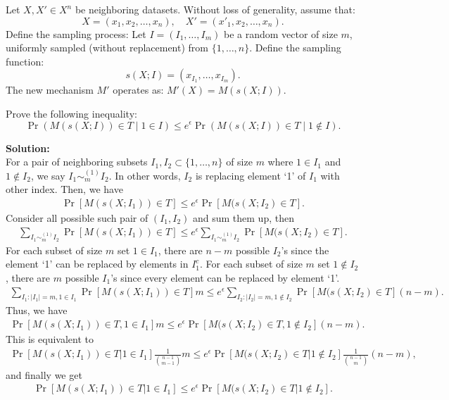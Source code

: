 \documentclass[12pt]{article}
\begin{document}
\begin{enumerate}
Let $X, X' \in X^n$ be neighboring datasets. Without loss of generality, assume that:
\[
X = (x_1, x_2, \dots, x_n), \quad X' = (x'_1, x_2, \dots, x_n).
\]
Define the sampling process:
Let $I = (I_1, \dots, I_m)$ be a random vector of size $m$, uniformly sampled (without replacement) from $\{1, \dots, n\}$.
Define the sampling function:
\[
s(X; I) = (x_{I_1}, \dots, x_{I_m}).
\]
The new mechanism $M'$ operates as: $M'(X) = M(s(X; I))$.

Prove the following inequality:
\[
\Pr(M (s(X; I)) \in T \mid 1 \in I) \leq e^{\epsilon} \Pr(M (s(X; I)) \in T \mid 1 \notin I).
\]
\begin{solution}
{\bf Solution:}\\
For a pair of neighboring subsets $I_1, I_2\subset \{1, \dots, n\}$ of size $m$ 
where $1\in I_1$ and $1\notin I_2$, we say $I_1 \sim_m^{(1)} I_2$.
In other words, $I_2$ is replacing element `1' of $I_1$ with other index.
Then, we have
\begin{align}
    \Pr[M(s(X;I_1))\in T] \leq e^\epsilon \Pr[M(s(X;I_2)\in T].
\end{align}
Consider all possible such pair of $(I_1, I_2)$ and sum them up, then
\begin{align}
    \sum_{I_1\sim_m^{(1)} I_2} \Pr[M(s(X;I_1))\in T] \leq e^\epsilon \sum_{I_1\sim_m^{(1)} I_2} \Pr[M(s(X;I_2)\in T].
\end{align}
For each subset of size $m$ set $1\in I_1$, there are $n-m$ possible $I_2$'s
since the element `1' can be replaced by elements in $I_1^c$.
For each subset of size $m$ set $1\notin I_2$, there are $m$ possible $I_1$'s
since every element can be replaced by element `1'.
\begin{align}
    \sum_{I_1: |I_1|=m, 1\in I_1} \Pr[M(s(X;I_1))\in T] m 
    \leq e^\epsilon \sum_{I_2: |I_2|=m, 1\notin I_2} \Pr[M(s(X;I_2)\in T] (n-m).
\end{align}
Thus, we have
\begin{align}
    \Pr[M(s(X;I_1))\in T, 1\in I_1] m 
    \leq
     e^\epsilon \Pr[M(s(X;I_2)\in T, 1\notin I_2] (n-m).
\end{align}
This is equivalent to 
\begin{align}
    \Pr[M(s(X;I_1))\in T| 1\in I_1] \frac{1}{\binom{n-1}{m-1}} m 
    \leq
    e^\epsilon \Pr[M(s(X;I_2)\in T| 1\notin I_2] \frac{1}{\binom{n-1}{m}} (n-m),
\end{align}
and finally we get
\begin{align}
    \Pr[M(s(X;I_1))\in T| 1\in I_1] 
    \leq
    e^\epsilon \Pr[M(s(X;I_2)\in T| 1\notin I_2].
\end{align}
\end{solution}




\end{enumerate}
\end{document}

